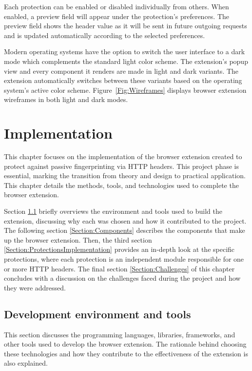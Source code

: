 Each protection can be enabled or disabled individually from others. When enabled, a preview field will appear under the protection's preferences. The preview field shows the header value as it will be sent in future outgoing requests and is updated automatically according to the selected preferences.

Modern operating systems have the option to switch the user interface to a dark mode which complements the standard light color scheme. The extension's popup view and every component it renders are made in light and dark variants. The extension automatically switches between these variants based on the operating system's active color scheme. Figure~\ref{Fig:Wireframes} displays browser extension wireframes in both light and dark modes.


\chapter{Implementation}
\label{Chapter:Implementation}

This chapter focuses on the implementation of the browser extension created to protect against passive fingerprinting via HTTP headers. This project phase is essential, marking the transition from theory and design to practical application. This chapter details the methods, tools, and technologies used to complete the browser extension.

Section \ref{Section:Environment} briefly overviews the environment and tools used to build the extension, discussing why each was chosen and how it contributed to the project. The following section \ref{Section:Components} describes the components that make up the browser extension. Then, the third section \ref{Section:ProtectionsImplementation} provides an in-depth look at the specific protections, where each protection is an independent module responsible for one or more HTTP headers. The final section \ref{Section:Challenges} of this chapter concludes with a discussion on the challenges faced during the project and how they were addressed.

\section{Development environment and tools}
\label{Section:Environment}

This section discusses the programming languages, libraries, frameworks, and other tools used to develop the browser extension. The rationale behind choosing these technologies and how they contribute to the effectiveness of the extension is also explained.

